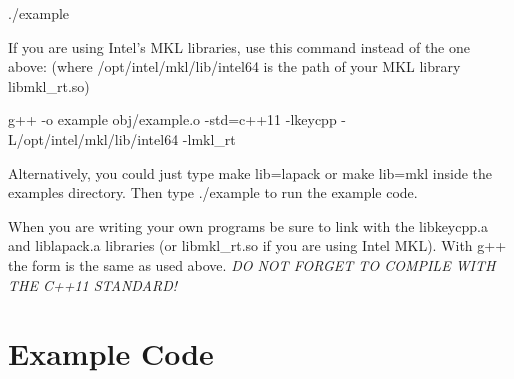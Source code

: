 {\ttfamily ./example}

If you are using Intel's M\-K\-L libraries, use this command instead of the one above\-: (where {\ttfamily /opt/intel/mkl/lib/intel64} is the path of your M\-K\-L library {\ttfamily libmkl\-\_\-rt.\-so})

{\ttfamily g++ -\/o example obj/example.\-o -\/std=c++11 -\/lkeycpp -\/\-L/opt/intel/mkl/lib/intel64 -\/lmkl\-\_\-rt}

Alternatively, you could just type {\ttfamily make lib=lapack} or {\ttfamily make lib=mkl} inside the {\ttfamily examples} directory. Then type {\ttfamily ./example} to run the example code.

When you are writing your own programs be sure to link with the {\ttfamily libkeycpp.\-a} and {\ttfamily liblapack.\-a} libraries (or {\ttfamily libmkl\-\_\-rt.\-so} if you are using Intel M\-K\-L). With {\ttfamily g++} the form is the same as used above. {\itshape D\-O N\-O\-T F\-O\-R\-G\-E\-T T\-O C\-O\-M\-P\-I\-L\-E W\-I\-T\-H T\-H\-E C++11 S\-T\-A\-N\-D\-A\-R\-D!}

\section*{Example Code}

